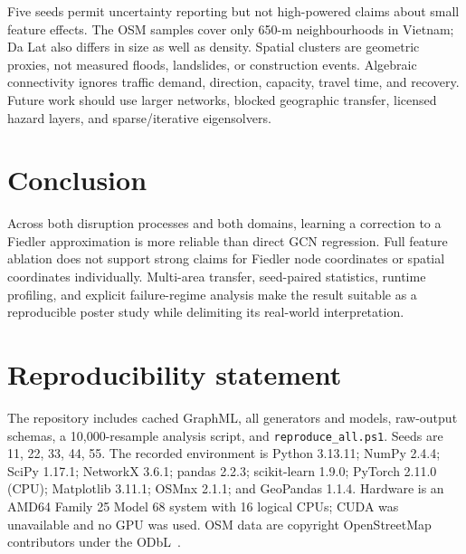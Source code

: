 \documentclass[11pt]{amsart}
\begin{document}
Five seeds permit uncertainty reporting but not high-powered claims about small
feature effects. The OSM samples cover only 650-m neighbourhoods in Vietnam;
Da Lat also differs in size as well as density. Spatial clusters are geometric
proxies, not measured floods, landslides, or construction events. Algebraic
connectivity ignores traffic demand, direction, capacity, travel time, and
recovery. Future work should use larger networks, blocked geographic transfer,
licensed hazard layers, and sparse/iterative eigensolvers.

\section{Conclusion}
Across both disruption processes and both domains, learning a correction to a
Fiedler approximation is more reliable than direct GCN regression. Full
feature ablation does not support strong claims for Fiedler node coordinates or
spatial coordinates individually. Multi-area transfer, seed-paired statistics,
runtime profiling, and explicit failure-regime analysis make the result suitable
as a reproducible poster study while delimiting its real-world interpretation.

\section*{Reproducibility statement}
The repository includes cached GraphML, all generators and models, raw-output
schemas, a 10,000-resample analysis script, and \texttt{reproduce\_all.ps1}.
Seeds are 11, 22, 33, 44, 55. The recorded environment is Python 3.13.11;
NumPy 2.4.4; SciPy 1.17.1; NetworkX 3.6.1; pandas 2.2.3; scikit-learn 1.9.0;
PyTorch 2.11.0 (CPU); Matplotlib 3.11.1; OSMnx 2.1.1; and GeoPandas 1.1.4.
Hardware is an AMD64 Family 25 Model 68 system with 16 logical CPUs; CUDA was
unavailable and no GPU was used. OSM data are copyright OpenStreetMap
contributors under the ODbL~\cite{osm}.

\appendix
\end{document}
